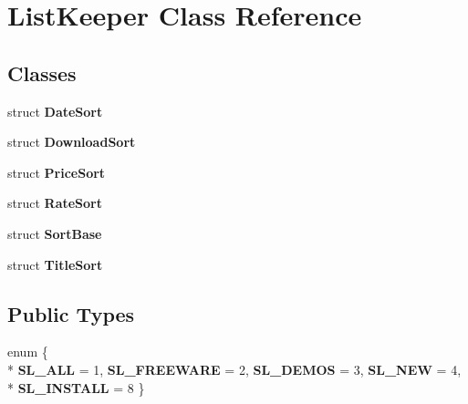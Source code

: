 \hypertarget{class_list_keeper}{\section{List\-Keeper Class Reference}
\label{class_list_keeper}
}
\subsection*{Classes}
\begin{DoxyCompactItemize}
\item 
struct {\bfseries Date\-Sort}
\item 
struct {\bfseries Download\-Sort}
\item 
struct {\bfseries Price\-Sort}
\item 
struct {\bfseries Rate\-Sort}
\item 
struct {\bfseries Sort\-Base}
\item 
struct {\bfseries Title\-Sort}
\end{DoxyCompactItemize}
\subsection*{Public Types}
\begin{DoxyCompactItemize}
\item 
enum \{ \\*
{\bfseries S\-L\-\_\-\-A\-L\-L} =  1, 
{\bfseries S\-L\-\_\-\-F\-R\-E\-E\-W\-A\-R\-E} =  2, 
{\bfseries S\-L\-\_\-\-D\-E\-M\-O\-S} =  3, 
{\bfseries S\-L\-\_\-\-N\-E\-W} =  4, 
\\*
{\bfseries S\-L\-\_\-\-I\-N\-S\-T\-A\-L\-L} =  8
 \}
\end{DoxyCompactItemize}
